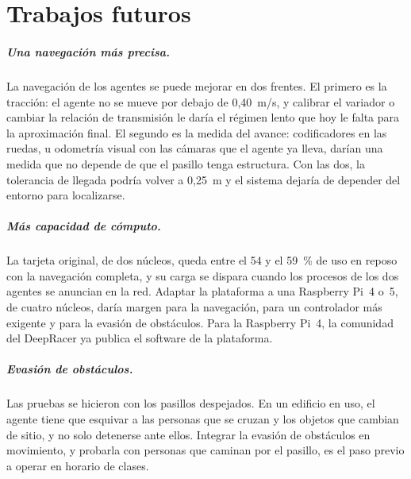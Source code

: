 %
\chapter*{Trabajos futuros}

\paragraph{Una navegación más precisa.} La navegación de los agentes se puede
mejorar en dos frentes. El primero es la tracción: el agente no se mueve por
debajo de 0,40~m/s, y calibrar el variador o cambiar la relación de transmisión
le daría el régimen lento que hoy le falta para la aproximación final. El
segundo es la medida del avance: codificadores en las ruedas, u odometría visual
con las cámaras que el agente ya lleva, darían una medida que no depende de que
el pasillo tenga estructura. Con las dos, la tolerancia de llegada podría volver
a 0,25~m y el sistema dejaría de depender del entorno para localizarse.

\paragraph{Más capacidad de cómputo.} La tarjeta original, de dos núcleos,
queda entre el 54 y el 59~\% de uso en reposo con la navegación completa, y su
carga se dispara cuando los procesos de los dos agentes se anuncian en la red.
Adaptar la plataforma a una Raspberry Pi~4 o~5, de cuatro núcleos, daría margen
para la navegación, para un controlador más exigente y para la evasión de
obstáculos. Para la Raspberry Pi~4, la comunidad del DeepRacer ya publica el
software de la plataforma.

\paragraph{Evasión de obstáculos.} Las pruebas se hicieron con los pasillos
despejados. En un edificio en uso, el agente tiene que esquivar a las personas
que se cruzan y los objetos que cambian de sitio, y no solo detenerse ante
ellos. Integrar la evasión de obstáculos en movimiento, y probarla con
personas que caminan por el pasillo, es el paso previo a operar en horario de
clases.

